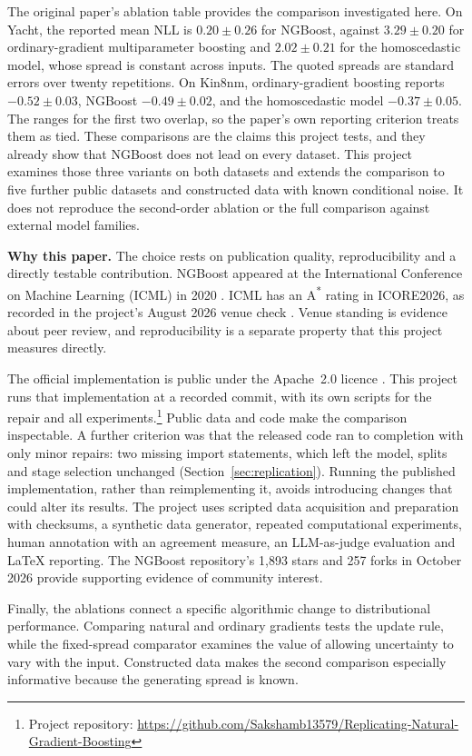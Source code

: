 The original paper's ablation table provides the comparison investigated here.
On Yacht, the reported mean NLL is $0.20 \pm 0.26$ for NGBoost, against $3.29 \pm 0.20$ for ordinary-gradient multiparameter boosting and $2.02 \pm 0.21$ for the homoscedastic model, whose spread is constant across inputs.
The quoted spreads are standard errors over twenty repetitions.
On Kin8nm, ordinary-gradient boosting reports $-0.52 \pm 0.03$, NGBoost $-0.49 \pm 0.02$, and the homoscedastic model $-0.37 \pm 0.05$.
The ranges for the first two overlap, so the paper's own reporting criterion treats them as tied.
These comparisons are the claims this project tests, and they already show that NGBoost does not lead on every dataset.
This project examines those three variants on both datasets and extends the comparison to five further public datasets and constructed data with known conditional noise.
It does not reproduce the second-order ablation or the full comparison against external model families.

\textbf{Why this paper.}
The choice rests on publication quality, reproducibility and a directly testable contribution.
NGBoost appeared at the International Conference on Machine Learning (ICML) in 2020 \cite{duan2020ngboost}.
ICML has an A\textsuperscript{*} rating in ICORE2026, as recorded in the project's August 2026 venue check \cite{icore2026icml}.
Venue standing is evidence about peer review, and reproducibility is a separate property that this project measures directly.

The official implementation is public under the Apache~2.0 licence \cite{ngboostrepo}.
This project runs that implementation at a recorded commit, with its own scripts for the repair and all experiments.\footnote{\label{fn:repo}\raggedright Project repository: \url{https://github.com/Sakshamb13579/Replicating-Natural-Gradient-Boosting}}
Public data and code make the comparison inspectable.
A further criterion was that the released code ran to completion with only minor repairs: two missing import statements, which left the model, splits and stage selection unchanged (Section~\ref{sec:replication}).
Running the published implementation, rather than reimplementing it, avoids introducing changes that could alter its results.
The project uses scripted data acquisition and preparation with checksums, a synthetic data generator, repeated computational experiments, human annotation with an agreement measure, an LLM-as-judge evaluation and LaTeX reporting.
The NGBoost repository's 1{,}893 stars and 257 forks in October 2026 provide supporting evidence of community interest.

Finally, the ablations connect a specific algorithmic change to distributional performance.
Comparing natural and ordinary gradients tests the update rule, while the fixed-spread comparator examines the value of allowing uncertainty to vary with the input.
Constructed data makes the second comparison especially informative because the generating spread is known.
